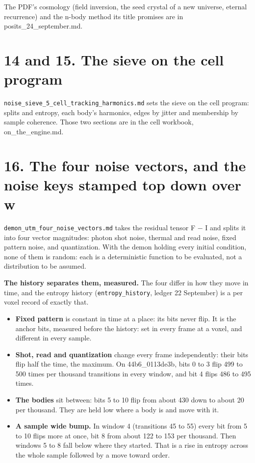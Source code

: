 The PDF's cosmology (field inversion, the seed crystal of a new universe, eternal recurrence) and the n-body method its title promises are in posits\_\allowbreak{}24\_\allowbreak{}september.md.

\section{\texorpdfstring{14 and 15. The sieve on the cell program}{14 and 15. The sieve on the cell program}}

\texttt{noise\_\allowbreak{}sieve\_\allowbreak{}5\_\allowbreak{}cell\_\allowbreak{}tracking\_\allowbreak{}harmonics.\allowbreak{}md} sets the sieve on the cell program: splits and entropy, each body's harmonics, edges by jitter and membership by sample coherence. Those two sections are in the cell workbook, on\_\allowbreak{}the\_\allowbreak{}engine.md.

\section{\texorpdfstring{16. The four noise vectors, and the noise keys stamped top down over w}{16. The four noise vectors, and the noise keys stamped top down over w}}

\texttt{demon\_\allowbreak{}utm\_\allowbreak{}four\_\allowbreak{}noise\_\allowbreak{}vectors.\allowbreak{}md} takes the residual tensor F − I and splits it into four vector magnitudes: photon shot noise, thermal and read noise, fixed pattern noise, and quantization. With the demon holding every initial condition, none of them is random: each is a deterministic function to be evaluated, not a distribution to be assumed.

\textbf{The history separates them, measured.} The four differ in how they move in time, and the entropy history (\texttt{entropy\_\allowbreak{}history}, ledger 22 September) is a per voxel record of exactly that.

\begin{itemize}
\item \textbf{Fixed pattern} is constant in time at a place: its bits never flip. It is the anchor bits, measured before the history: set in every frame at a voxel, and different in every sample.
\item \textbf{Shot, read and quantization} change every frame independently: their bits flip half the time, the maximum. On 44b6\_\allowbreak{}0113de3b, bits 0 to 3 flip 499 to 500 times per thousand transitions in every window, and bit 4 flips 486 to 495 times.
\item \textbf{The bodies} sit between: bits 5 to 10 flip from about 430 down to about 20 per thousand. They are held low where a body is and move with it.
\item \textbf{A sample wide bump.} In window 4 (transitions 45 to 55) every bit from 5 to 10 flips more at once, bit 8 from about 122 to 153 per thousand. Then windows 5 to 8 fall below where they started. That is a rise in entropy across the whole sample followed by a move toward order.
\end{itemize}

